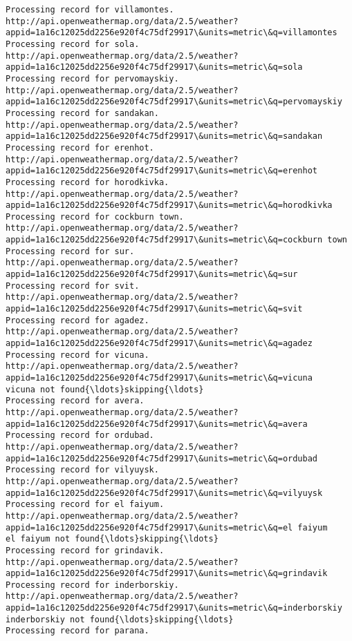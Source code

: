 \documentclass[11pt]{article}
\begin{document}
\begin{Verbatim}[commandchars=\\\{\}]
Processing record for villamontes.
http://api.openweathermap.org/data/2.5/weather?appid=1a16c12025dd2256e920f4c75df29917\&units=metric\&q=villamontes
Processing record for sola.
http://api.openweathermap.org/data/2.5/weather?appid=1a16c12025dd2256e920f4c75df29917\&units=metric\&q=sola
Processing record for pervomayskiy.
http://api.openweathermap.org/data/2.5/weather?appid=1a16c12025dd2256e920f4c75df29917\&units=metric\&q=pervomayskiy
Processing record for sandakan.
http://api.openweathermap.org/data/2.5/weather?appid=1a16c12025dd2256e920f4c75df29917\&units=metric\&q=sandakan
Processing record for erenhot.
http://api.openweathermap.org/data/2.5/weather?appid=1a16c12025dd2256e920f4c75df29917\&units=metric\&q=erenhot
Processing record for horodkivka.
http://api.openweathermap.org/data/2.5/weather?appid=1a16c12025dd2256e920f4c75df29917\&units=metric\&q=horodkivka
Processing record for cockburn town.
http://api.openweathermap.org/data/2.5/weather?appid=1a16c12025dd2256e920f4c75df29917\&units=metric\&q=cockburn town
Processing record for sur.
http://api.openweathermap.org/data/2.5/weather?appid=1a16c12025dd2256e920f4c75df29917\&units=metric\&q=sur
Processing record for svit.
http://api.openweathermap.org/data/2.5/weather?appid=1a16c12025dd2256e920f4c75df29917\&units=metric\&q=svit
Processing record for agadez.
http://api.openweathermap.org/data/2.5/weather?appid=1a16c12025dd2256e920f4c75df29917\&units=metric\&q=agadez
Processing record for vicuna.
http://api.openweathermap.org/data/2.5/weather?appid=1a16c12025dd2256e920f4c75df29917\&units=metric\&q=vicuna
vicuna not found{\ldots}skipping{\ldots}
Processing record for avera.
http://api.openweathermap.org/data/2.5/weather?appid=1a16c12025dd2256e920f4c75df29917\&units=metric\&q=avera
Processing record for ordubad.
http://api.openweathermap.org/data/2.5/weather?appid=1a16c12025dd2256e920f4c75df29917\&units=metric\&q=ordubad
Processing record for vilyuysk.
http://api.openweathermap.org/data/2.5/weather?appid=1a16c12025dd2256e920f4c75df29917\&units=metric\&q=vilyuysk
Processing record for el faiyum.
http://api.openweathermap.org/data/2.5/weather?appid=1a16c12025dd2256e920f4c75df29917\&units=metric\&q=el faiyum
el faiyum not found{\ldots}skipping{\ldots}
Processing record for grindavik.
http://api.openweathermap.org/data/2.5/weather?appid=1a16c12025dd2256e920f4c75df29917\&units=metric\&q=grindavik
Processing record for inderborskiy.
http://api.openweathermap.org/data/2.5/weather?appid=1a16c12025dd2256e920f4c75df29917\&units=metric\&q=inderborskiy
inderborskiy not found{\ldots}skipping{\ldots}
Processing record for parana.

\end{Verbatim}
\end{document}
